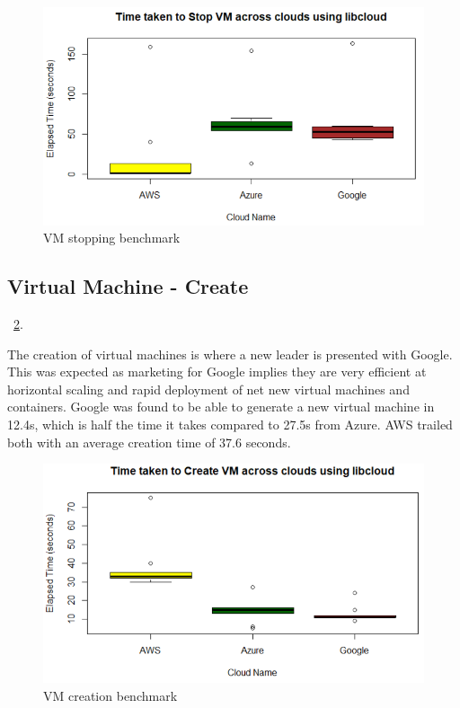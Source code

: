 \begin{figure}[!ht]
  \centering
  \includegraphics[width=\columnwidth]{images/StopVM.png}
  \caption{VM stopping benchmark}\label{F:vm-stop}
\end{figure}

\subsection{Virtual Machine - Create}~\ref{F:vm-create}.

The creation of virtual machines is where a new leader is presented with
Google. This was expected as marketing for Google implies they are very
efficient at horizontal scaling and rapid deployment of net new virtual
machines and containers. Google was found to be able to generate a new virtual
machine in 12.4s, which is half the time it takes compared to 27.5s from Azure.
AWS trailed both with an average creation time of 37.6 seconds.

\begin{figure}[!ht]
  \centering
  \includegraphics[width=\columnwidth]{images/CreateVM.png}
  \caption{VM creation benchmark}\label{F:vm-create}
\end{figure}

